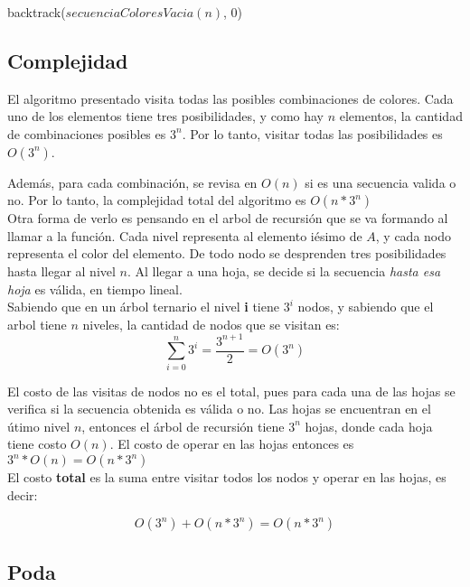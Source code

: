 \begin{algorithm}
\begin{algorithmic}
  \State backtrack($secuenciaColoresVacia(n)$, $0$)
\EndProcedure
\end{algorithmic}
\end{algorithm}


\subsection{Complejidad}

El algoritmo presentado visita todas las posibles combinaciones de colores. Cada uno de los elementos tiene tres posibilidades, y como hay $n$ elementos, la cantidad de combinaciones posibles es $3^{n}$. Por lo tanto, visitar todas las posibilidades es $O(3^{n})$.

Además, para cada combinación, se revisa en $O(n)$ si es una secuencia valida o no. Por lo tanto, la complejidad total del algoritmo es $O(n * 3^{n})$ \\

Otra forma de verlo es pensando en el arbol de recursión que se va formando al llamar a la función. Cada nivel representa al elemento iésimo de $A$, y cada nodo representa el color del elemento. De todo nodo se desprenden tres posibilidades hasta llegar al nivel $n$. Al llegar a una hoja, se decide si la secuencia \textit{hasta esa hoja} es válida, en tiempo lineal. \\

Sabiendo que en un árbol ternario el nivel \textbf{i} tiene $3^{i}$ nodos, y sabiendo que el arbol tiene $n$ niveles, la cantidad de nodos que se visitan es: \\

$$\sum_{i = 0}^{n} 3^{i} = \frac{3^{n+1}}{2} = O(3^n)$$

El costo de las visitas de nodos no es el total, pues para cada una de las hojas se verifica si la secuencia obtenida es válida o no. Las hojas se encuentran en el útimo nivel $n$, entonces el árbol de recursión tiene $3^n$ hojas, donde cada hoja tiene costo $O(n)$. El costo de operar en las hojas entonces es $3^n * O(n) = O(n * 3^n)$ \\

El costo \textbf{total} es la suma entre visitar todos los nodos y operar en las hojas, es decir:

$$O(3^n) + O(n * 3^n) = O(n * 3^n) $$


\subsection{Poda}

